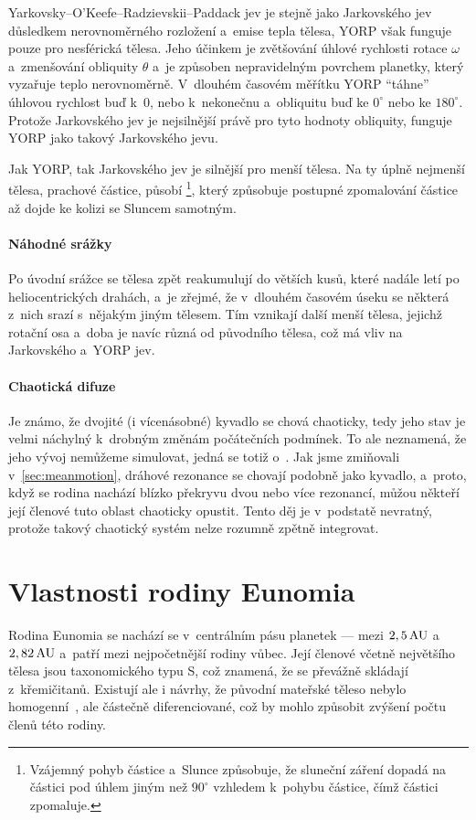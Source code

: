 \documentclass[A4paper, 12pt, oneside]{book}
\begin{document}
Yarkovsky–O'Keefe–Radzievskii–Paddack jev je stejně jako Jarkovského jev důsledkem nerovnoměrného rozložení a~emise tepla tělesa, YORP však funguje pouze pro nesférická tělesa. Jeho účinkem je zvětšování úhlové rychlosti rotace $\omega$ a~zmenšování obliquity $\theta$ a~je způsoben nepravidelným povrchem planetky, který vyzařuje teplo nerovnoměrně. V~dlouhém časovém měřítku YORP \enquote{táhne} úhlovou rychlost buď k~$0$, nebo k~nekonečnu a~obliquitu buď ke $0^\circ$ nebo ke $180^\circ$. Protože Jarkovského jev je nejsilnější právě pro tyto hodnoty obliquity, funguje YORP jako takový  Jarkovského jevu. 

Jak YORP, tak Jarkovského jev je silnější pro menší tělesa. Na ty úplně nejmenší tělesa, prachové částice, působí \footnote{Vzájemný pohyb částice a~Slunce způsobuje, že sluneční záření dopadá na částici pod úhlem jiným než $90^\circ$ vzhledem k~pohybu částice, čímž částici zpomaluje.}, který způsobuje postupné zpomalování částice až dojde ke kolizi se Sluncem samotným. 

\subsubsection{Náhodné srážky}
Po úvodní srážce se tělesa zpět reakumulují do větších kusů, které nadále letí po heliocentrických drahách, a~je zřejmé, že v~dlouhém časovém úseku se některá z~nich srazí s~nějakým jiným tělesem. Tím vznikají další menší tělesa, jejichž rotační osa a~doba je navíc různá od původního tělesa, což má vliv na Jarkovského a~YORP jev. 

\subsubsection{Chaotická difuze}
Je známo, že dvojité (i vícenásobné) kyvadlo se chová chaoticky, tedy jeho stav je velmi náchylný k~drobným změnám počátečních podmínek. To ale neznamená, že jeho vývoj nemůžeme simulovat, jedná se totiž o~. Jak jsme zmiňovali v~\ref{sec:meanmotion}, dráhové rezonance se chovají podobně jako kyvadlo, a~proto, když se rodina nachází blízko překryvu dvou nebo více rezonancí, můžou někteří její členové tuto oblast chaoticky opustit. Tento děj je v~podstatě nevratný, protože takový chaotický systém nelze rozumně zpětně integrovat.

\chapter{Vlastnosti rodiny Eunomia} \label{ch:eunomia}
Rodina Eunomia se nachází se v~centrálním pásu planetek --- mezi $2,5\,{\rm AU}$ a~$2,82\,{\rm AU}$ a~patří mezi nejpočetnější rodiny vůbec. Její členové včetně největšího tělesa jsou taxonomického typu S, což znamená, že se převážně skládají z~křemičitanů. Existují ale i návrhy, že původní mateřské těleso nebylo homogenní~\cite{nathues05}, ale částečně diferenciované, což by mohlo způsobit zvýšení počtu členů této rodiny.
\end{document}
